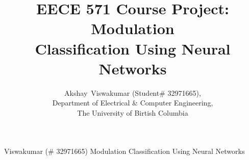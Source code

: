 \documentclass[journal,onecolumn]{IEEEtran}
\begin{document}
%
\title{EECE 571 Course Project: Modulation\\ Classification Using Neural Networks}
%
%
%

\author{Akshay~Viswakumar (Student\# 32971665), \\Department of Electrical \& Computer Engineering, \\The University of Birtish Columbia
}

% 
%

%
{Viswakumar (\# 32971665) \: Modulation Classification Using Neural Networks}
% 
\end{document}
